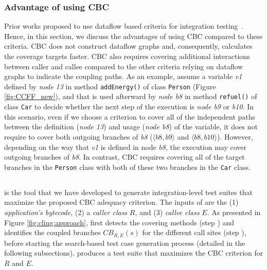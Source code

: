 \subsubsection{Advantage of using CBC}
Prior works proposed to use dataflow based criteria for integration testing~\cite{Jin1998, Harrold1994,Alexander2000, Alexander2003, Alexander2004, Alexander2010}. Hence, in this section, we discuss the advantages of using CBC compared to these criteria.
CBC does not construct dataflow graphs and, consequently, calculates the coverage targets faster. CBC also requires covering additional interactions between caller and callee compared to the other criteria relying on dataflow graphs to indicate the coupling paths. As an example, assume a variable \textit{v1} defined by \textit{node 13} in method \texttt{addEnergy()} of class \texttt{Person} (Figure \ref{fig:CCFF_new}), and that is used afterward by \textit{node b8} in method \texttt{refuel()} of class \texttt{Car} to decide whether the next step of the execution is \textit{node b9} or \textit{b10}. In this scenario, even if we choose a criterion to cover all of the independent paths between the definition (\textit{node 13}) and usage (\textit{node b8}) of the variable, it does not require to cover both outgoing branches of \textit{b8} ($\langle b8,b9\rangle$ and $\langle b8,b10\rangle$). However, depending on the way that  \textit{v1} is defined in node \textit{b8}, the execution may cover outgoing branches of \textit{b8}. In contrast, CBC requires covering all of the target branches in the \texttt{Person} class with both of these two branches in the \texttt{Car} class. 

\subsection{\cling}
\label{sec:cling}

\cling is the tool that we have developed to generate integration-level test suites that maximize the proposed CBC adequacy criterion. The inputs of \cling are the (1) \emph{application's bytecode}, (2) a \emph{caller class} $R$, and (3) \emph{callee class} $E$. As presented in Figure \ref{fig:cling:approach}, \cling first detects the covering methods (step ) and identifies the coupled branches $CB_{R,E}(s)$ for the different call sites (step ), before starting the search-based test case generation process (detailed in the following subsections). \cling produces a test suite that maximizes the CBC criterion for $R$ and $E$.

